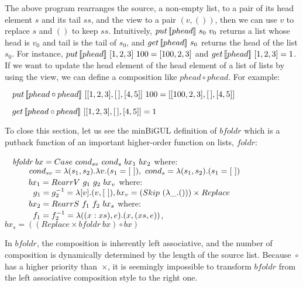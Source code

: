 The above program rearranges the source, a non-empty list, to a pair of its head element $s$ and its tail $ss$, and the view to a pair $(v, ())$, then we can use $v$ to replace $s$ and $()$ to keep $ss$. Intuitively, $put \, [\![phead]\!] \ s_0 \ v_0$ returns a list whose head is $v_0$ and tail is the tail of $s_0$, and $get \, [\![phead]\!] \ s_0$ returns the head of the list $s_0$. For instance, $put \, [\![phead]\!] \ [1,2,3] \ 100 = [100,2,3]$ and $get \, [\![phead]\!] \ [1,2,3] = 1$. If we want to update the head element of the head element of a list of lists by using the view, we can define a composition like $phead \circ phead$. For example:

\smallvspace
$\hspace*{3mm} put \, [\![phead \circ phead]\!] \ [[1,2,3],[\,],[4,5]] \ 100 = [[100,2,3],[\,],[4,5]]$

$\hspace*{3mm} get \, [\![phead \circ phead]\!] \ [[1,2,3],[\,],[4,5]] = 1$
\smallvspace

To close this section,
let us see the minBiGUL definition of $\textit{bfoldr}$ which is a putback function of an important higher-order function on lists, $\textit{foldr}$:

\smallvspace
$\tab \textit{bfoldr} \ bx = Case \ cond_{sv} \ cond_s \ bx_1 \ bx_2$ where:\\
$\tabs{3} \ cond_{sv} = \lambda (s_1,s_2).\lambda v.(s_1 = [\ ]), \ cond_s = \lambda (s_1,s_2).(s_1 = [\ ])$\\
$\tabs{3} \ bx_1 = RearrV \ g_1 \ g_2 \ bx_v$ where: \\
    $\tabs{4} g_1 = g_2^{-1} = \lambda [v].(v,[\ ]), bx_v = (Skip \ (\lambda \_.())) \times Replace$\\
$\tabs{3} \ bx_2 = RearrS \ f_1 \ f_2 \ bx_s$ where:\\
    $\tabs{4} f_1 = f_2^{-1} = \lambda ((x:xs),e).(x,(xs,e))$, 
$bx_s = ((Replace \times bfoldr \ bx) \circ bx)$
\smallvspace

\noindent In $\textit{bfoldr}$, the composition is inherently left associative, and the number of composition is dynamically determined by the length of the source list. Because~$\circ$ has a higher priority than~$\times$, it is seemingly impossible to transform $\mathit{bfoldr}$ from the left associative composition style to the right one. 
